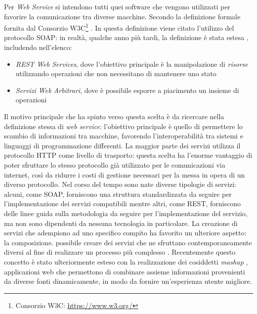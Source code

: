 Per \emph{Web Service} si intendono tutti quei software che vengono utilizzati per favorire la comunicazione tra diverse macchine. Secondo la definizione formale fornita dal Consorzio W3C\footnote{Consorzio W3C: \url{https://www.w3.org/}}  \cite{world2004web}. In questa definizione viene citato l'utilizzo del protocollo SOAP: in realtà, qualche anno più tardi, la definizione è stata estesa \cite{w3c2004web}, includendo nell'elenco:

\begin{itemize}
	\item \emph{REST Web Services}, dove l'obiettivo principale è la manipolazione di \emph{risorse} utilizzando operazioni che non necessitano di mantenere uno stato
	\item \emph{Servizi Web Arbitrari}, dove è possibile esporre a piacimento un insieme di operazioni
\end{itemize}

Il motivo principale che ha spinto verso questa scelta è da ricercare nella definizione stessa di \emph{web service}: l'obiettivo principale è quello di permettere lo scambio di informazioni tra macchine, favorendo l'interoperabilità tra sistemi e linguaggi di programmazione differenti. La maggior parte dei servizi utilizza il protocollo HTTP come livello di trasporto: questa scelta ha l'enorme vantaggio di poter sfruttare lo stesso protocollo già utilizzato per le comunicazioni via internet, così da ridurre i costi di gestione necessari per la messa in opera di un diverso protocollo. Nel corso del tempo sono nate diverse tipologie di servizi: alcuni, come SOAP, forniscono una struttura standardizzata da seguire per l'implementazione dei servizi compatibili mentre altri, come REST, forniscono delle linee guida sulla metodologia da seguire per l'implementazione del servizio, ma non sono dipendenti da nessuna tecnologia in particolare. La creazione di servizi che adempiono ad uno specifico compito ha favorito un ulteriore aspetto: la composizione. \upe possibile creare dei servizi che ne sfruttano contemporaneamente diversi al fine di realizzare un processo più complesso \cite{weerawarana2005web}. Recentemente questo concetto è stato ulteriormente esteso con la realizzazione dei cosiddetti \emph{mashup} \cite{benslimane2008services}, applicazioni web che permettono di combinare assieme informazioni provenienti da diverse fonti dinamicamente, in modo da fornire un'esperienza utente migliore.

